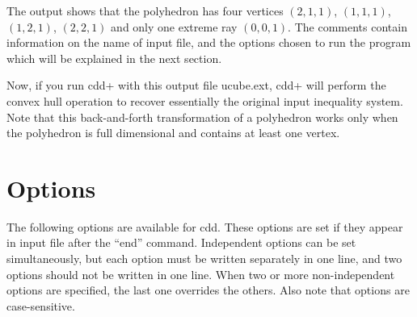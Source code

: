 \documentclass[11pt]{article}
\begin{document}
The output shows that the polyhedron has four vertices
$(2,1,1)$, $(1,1,1)$, $(1,2,1)$, $(2,2,1)$ and
only one extreme ray $(0,0,1)$.  The comments contain
information on the name of input file, and the options
chosen to run the program which will be explained in
the next section.  

Now, if you run cdd+ with this output file ucube.ext,
cdd+ will perform the convex hull operation to recover 
essentially the original input inequality system.  Note that
this back-and-forth transformation of a polyhedron works
only when the polyhedron is full dimensional and contains
at least one vertex.

\section{Options}  \label{OPTIONS}

The following options are available for cdd.  These options are
set if they appear in input file after the ``end'' command.
Independent options can be set simultaneously, but each option
must be written separately in one line, and  two options
should not be written in one line.  When two or more non-independent
options are specified, the last one overrides the others.
Also note that options are case-sensitive.
\end{document}
